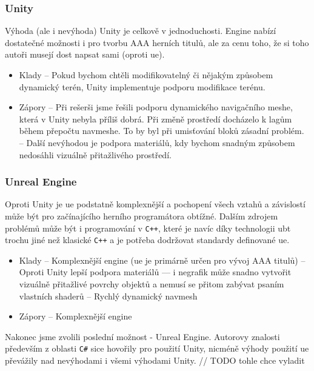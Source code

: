 \subsubsection{Unity}
Výhoda (ale i nevýhoda) Unity je celkově v jednoduchosti. Engine nabízí dostatečné možnosti i pro tvorbu AAA herních titulů, ale za cenu toho, že si toho autoři musejí dost napsat sami (oproti \gls{ue}). 
\begin{itemize}
	\item Klady
		\subitem -- Pokud bychom chtěli modifikovatelný či nějakým způsobem dynamický terén, Unity implementuje podporu modifikace terénu.
	\item Zápory
		\subitem -- Při rešerši jsme řešili podporu dynamického navigačního meshe, která v Unity nebyla příliš dobrá. Při změně prostředí docházelo k lagům během přepočtu navmeshe. To by byl při umisťování bloků zásadní problém.
		\subitem -- Další nevýhodou je podpora materiálů, kdy bychom snadným způsobem nedosáhli vizuálně přitažlivého prostředí.

\end{itemize}

\subsubsection{Unreal Engine}
Oproti Unity je \gls{ue} podstatně komplexnější a pochopení všech vztahů a závislostí může být pro začínajícího herního programátora obtížné. Dalším zdrojem problémů může být i programování v \texttt{C++}, které je navíc díky technologii \gls{ubt} trochu jiné než klasické \texttt{C++} a je potřeba dodržovat standardy definované \gls{ue}.
\begin{itemize}
	\item Klady
		\subitem -- Komplexnější engine (\gls{ue} je primárně určen pro vývoj AAA titulů)
		\subitem -- Oproti Unity lepší podpora materiálů --- i negrafik může snadno vytvořit vizuálně přitažlivé povrchy objektů a nemusí se přitom zabývat psaním vlastních shaderů 
		\subitem -- Rychlý dynamický navmesh
	\item Zápory
		\subitem -- Komplexnější engine

\end{itemize}

Nakonec jsme zvolili poslední možnost - Unreal Engine. Autorovy znalosti především z oblasti \texttt{C\#} sice hovořily pro použití Unity, nicméně výhody použití \gls{ue} převážily nad nevýhodami i všemi výhodami Unity.	// TODO tohle chce vyladit